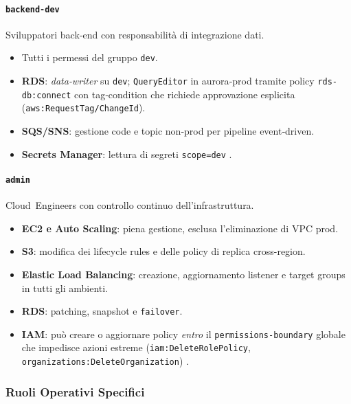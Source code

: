 \paragraph{\texttt{backend‑dev}}%
Sviluppatori back‑end con responsabilità di integrazione dati.  
\begin{itemize}
  \item Tutti i permessi del gruppo \texttt{dev}.  
  \item \textbf{RDS}: \emph{data‑writer} su \texttt{dev}; \texttt{QueryEditor} in aurora‑prod tramite
        policy \texttt{rds-db:connect} con tag‑condition che richiede
        approvazione esplicita (\texttt{aws:RequestTag/ChangeId}).  
  \item \textbf{SQS/SNS}: gestione code e topic non‑prod per pipeline event‑driven.  
  \item \textbf{Secrets Manager}: lettura di segreti \texttt{scope=dev} \cite{AWSIAMBestPractices}.  
\end{itemize}

\paragraph{\texttt{admin}}%
Cloud Engineers con controllo continuo dell'infrastruttura.  
\begin{itemize}
  \item \textbf{EC2 e Auto Scaling}: piena gestione, esclusa l'eliminazione di VPC prod.  
  \item \textbf{S3}: modifica dei lifecycle rules e delle policy di replica cross-region.
  
  \item \textbf{Elastic Load Balancing}: creazione, aggiornamento listener e target groups in tutti gli ambienti.
  
  \item \textbf{RDS}: patching, snapshot e \texttt{failover}.
  
  \item \textbf{IAM}: può creare o aggiornare policy \emph{entro} il \texttt{permissions-boundary} globale che impedisce azioni estreme (\texttt{iam:DeleteRolePolicy}, \texttt{organizations:DeleteOrganization}) \cite{AWSPermBoundaries}.
\end{itemize}

\subsubsection{Ruoli Operativi Specifici}
\label{subsubsec:ruoli_specifici}

